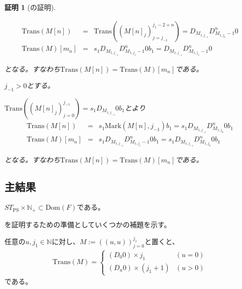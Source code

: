 \documentclass[dvipdfmx,uplatex]{jsarticle}
\theoremstyle{customnonumberbreakfortheorem}
\theoremstyle{customnonumberbreakforproof}
\newtheorem{hideableproof}{証明}
\begin{document}
\begin{hideableproof}[の証明]
\begin{indented}
\begin{indented}
\begin{indented}
\begin{indented}
\begin{eqnarray*}
					\textrm{Trans}(M[n]) & = & \textrm{Trans}((M[n]_j)_{j=j_{-1}}^{j_1-2+n}) = D_{M_{1,j_{-1}}} D_{M_{1,j_1}-1}^n 0 \\
					\textrm{Trans}(M)[m_n] & = & s_1 D_{M_{1,j_{-1}}} D_{M_{1,j_1}-1}^n 0 b_1 = D_{M_{1,j_{-1}}} D_{M_{1,j_1}-1}^n 0
					\end{eqnarray*}
					\item となる。すなわち\(\textrm{Trans}(M[n])  = \textrm{Trans}(M)[m_n]\)である。
				\end{indented}
				\item \(j_{-1} > 0\)とする。
				\begin{indented}
					\item \(\textrm{Trans}((M[n]_j)_{j=0}^{j_{-1}}) = s_1 D_{M_{1,j_{-1}}} 0 b_1\)とより
					\begin{eqnarray*}
					\textrm{Trans}(M[n]) & = & s_1 \textrm{Mark}(M[n],j_{-1}) b_1 = s_1 D_{M_{1,j_{-1}}} D_{M_{1,j_0}}^n 0 b_1 \\
					\textrm{Trans}(M)[m_n] & = & s_1 D_{M_{1,j_{-1}}} D_{M_{1,j_1}-1}^n 0 b_1 = s_1 D_{M_{1,j_{-1}}} D_{M_{1,j_0}}^n 0 b_1
					\end{eqnarray*}
				\end{indented}
				\item となる。すなわち\(\textrm{Trans}(M[n])  = \textrm{Trans}(M)[m_n]\)である。
			\end{indented}
		\end{indented}
	\end{indented}
\end{hideableproof}


\subsection{主結果}

\begin{theorem}[標準形ペア数列システムの停止性]\label{標準形ペア数列システムの停止性}
	\(ST_{\textrm{PS}} \times \mathbb{N}_{+} \subset \textrm{Dom}(F)\)である。
\end{theorem}

を証明するための準備としていくつかの補題を示す。

\begin{lemma}\label{公差(0,0)のペア数列のTransの基本性質}
	任意の\(u,j_1 \in \mathbb{N}\)に対し、\(M := ((u,u))_{j=0}^{j_1}\)と置くと、
	\begin{eqnarray*}
	\textrm{Trans}(M) = \left\{ \begin{array}{ll} (D_0 0) \times j_1 & (u = 0) \\ (D_u 0) \times (j_1+1) & (u > 0) \end{array} \right.
	\end{eqnarray*}
	である。
\end{lemma}
\end{document}
